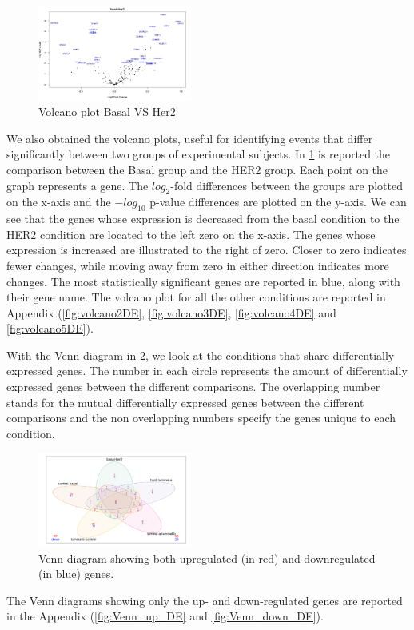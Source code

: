 \documentclass[journal]{IEEEtran}
\begin{document}
\begin{figure}[!ht]
    \centering
    \includegraphics[width=0.45\textwidth]{images/DE/volcano1DE.jpg}
    \caption{Volcano plot Basal VS Her2}
    \label{fig:volcano1DE}
\end{figure}
We also obtained the volcano plots, useful for identifying events that differ significantly between two groups of experimental subjects. \newline
In \cref{fig:volcano1DE} is reported the comparison between the Basal group and the HER2 group. Each point on the graph represents a gene. The $log_2$-fold differences between the groups are plotted on the x-axis and the $-log_{10}$ p-value differences are plotted on the y-axis. We can see that the genes whose expression is decreased from the basal condition to the HER2 condition are located to the left zero on the x-axis. The genes whose expression is increased are illustrated to the right of zero. Closer to zero indicates fewer changes, while moving away from zero in either direction indicates more changes. The most statistically significant genes are reported in blue, along with their gene name.
The volcano plot for all the other conditions are reported in Appendix (\cref{fig:volcano2DE}, \ref{fig:volcano3DE}, \ref{fig:volcano4DE} and \ref{fig:volcano5DE}).

With the Venn diagram in \cref{fig:VennDE}, we look at the conditions that share differentially expressed genes.
The number in each circle represents the amount of differentially expressed genes between the different comparisons. The overlapping number stands for the mutual differentially expressed genes between the different comparisons and the non overlapping numbers specify the genes unique to each condition.

\begin{figure}[!ht]
    \centering
    \includegraphics[width=0.45\textwidth]{images/DE/Venn_Up_and_down.jpg}
    \caption{Venn diagram showing both upregulated (in red) and downregulated (in blue) genes.}
    \label{fig:VennDE}
\end{figure}
The Venn diagrams showing only the up- and down-regulated genes are reported in the Appendix (\cref{fig:Venn_up_DE} and \ref{fig:Venn_down_DE}).
\end{document}
